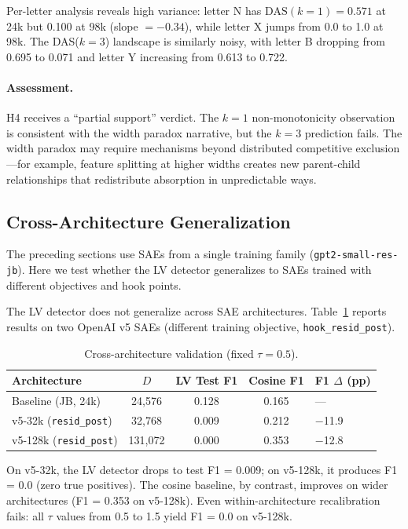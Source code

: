 \documentclass{article}
\begin{document}
Per-letter analysis reveals high variance: letter N has $\text{DAS}(k{=}1) = 0.571$ at 24k but 0.100 at 98k (slope $= -0.34$), while letter X jumps from 0.0 to 1.0 at 98k. The DAS($k{=}3$) landscape is similarly noisy, with letter B dropping from 0.695 to 0.071 and letter Y increasing from 0.613 to 0.722.

\paragraph{Assessment.} H4 receives a ``partial support'' verdict. The $k{=}1$ non-monotonicity observation is consistent with the width paradox narrative, but the $k{=}3$ prediction fails. The width paradox may require mechanisms beyond distributed competitive exclusion---for example, feature splitting at higher widths creates new parent-child relationships that redistribute absorption in unpredictable ways.


\subsection{Cross-Architecture Generalization}
\label{sec:cross_arch}

The preceding sections use SAEs from a single training family (\texttt{gpt2-small-res-jb}). Here we test whether the LV detector generalizes to SAEs trained with different objectives and hook points.

The LV detector does not generalize across SAE architectures. Table~\ref{tab:cross_arch} reports results on two OpenAI v5 SAEs (different training objective, \texttt{hook\_resid\_post}).

\begin{table}[t]
  \caption{Cross-architecture validation (fixed $\tau = 0.5$).}
  \label{tab:cross_arch}
  \centering
  \small
  \begin{tabular}{@{}lcccl@{}}
    \toprule
    Architecture & $D$ & LV Test F1 & Cosine F1 & F1 $\Delta$ (pp) \\
    \midrule
    Baseline (JB, 24k) & 24,576 & 0.128 & 0.165 & --- \\
    v5-32k (\texttt{resid\_post}) & 32,768 & 0.009 & 0.212 & $-$11.9 \\
    v5-128k (\texttt{resid\_post}) & 131,072 & 0.000 & 0.353 & $-$12.8 \\
    \bottomrule
  \end{tabular}
\end{table}

On v5-32k, the LV detector drops to test F1 = 0.009; on v5-128k, it produces F1 = 0.0 (zero true positives). The cosine baseline, by contrast, improves on wider architectures (F1 = 0.353 on v5-128k). Even within-architecture recalibration fails: all $\tau$ values from 0.5 to 1.5 yield F1 = 0.0 on v5-128k.
\end{document}
